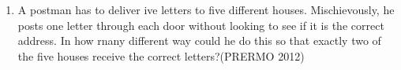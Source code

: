 \begin{enumerate}
\item A postman has to deliver ive letters to five different houses. Mischievously, he posts one letter through each door without looking to see if it is the correct address. In how rnany different way could he do this so that exactly two of the five houses receive the correct letters?\hfill(PRERMO 2012)
\end{enumerate}
